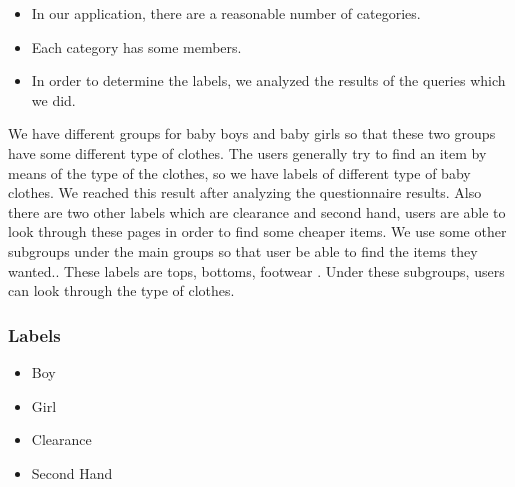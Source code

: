 \begin{itemize}
\item In our application, there are a reasonable number of categories. 
\item Each category has some members. 
\item In order to determine the labels, we analyzed the results of the queries which we did.
\end{itemize}

We have different groups for baby boys and baby girls so that these two groups have some different type of clothes. The users generally try to find an item by means of the type of the clothes, so we have labels of different type of baby clothes. We reached this result after analyzing the questionnaire results. Also there are two other labels which are clearance and second hand, users are able to look through these pages in order to find some cheaper items.
We use some other subgroups under the main groups so that user be able to find the items they wanted.. These labels are tops, bottoms, footwear . Under these subgroups, users can look through the type of clothes.

\subsubsection{Labels}
\begin{itemize}
\setlength{\itemsep}{-3pt}
\setlength{\parskip}{0pt}
\setlength{\parsep}{0pt}
 \item Boy 
 \item Girl 
 \item Clearance 
 \item Second Hand
\end{itemize}


